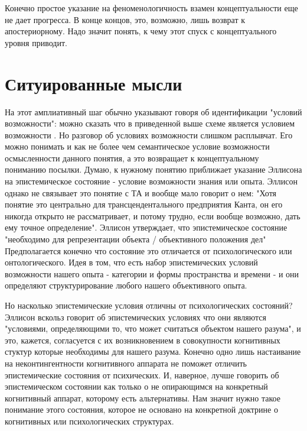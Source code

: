 \documentclass{article}
\begin{document}
Конечно простое указание на феноменологичность взамен концептуальности еще не дает прогресса. В конце концов, это, возможно, лишь возврат к апостериорному. Надо значит понять, к чему этот спуск с концептуального уровня приводит.

\section{Ситуированные мысли}

На этот амплиативный шаг обычно указывают говоря об идентификации "условий возможности": можно сказать что в приведенной выше схеме  является условием возможности . Но разговор об условиях возможности слишком расплывчат. Его можно понимать и как не более чем семантическое условие возможности осмысленности данного понятия, а это возвращает к концептуальному пониманию посылки. Думаю, к нужному понятию приближает указание Эллисона на эпистемическое состояние - условие возможности знания или опыта. Эллисон однако не связывает это понятие с ТА и вообще мало говорит о нем: "Хотя понятие это центрально для трансцендентального предприятия Канта, он его никогда открыто не рассматривает, и потому трудно, если вообще возможно, дать ему точное определение". Эллисон утверждает, что эпистемическое состояние "необходимо для репрезентации объекта / объективного положения дел" Предполагается конечно что состояние это отличается от психологического или онтологического. Идея в том, что есть набор эпистемических условий возможности нашего опыта - категории и формы пространства и времени - и они определяют структурирование любого нашего объективного опыта.

Но насколько эпистемические условия отличны от психологических состояний? Эллисон вскольз говорит об эпистемических условиях что они являются "условиями, определяющими то, что может считаться объектом нашего разума", и это, кажется, согласуется с их возникновением в совокупности когнитивных стуктур которые необходимы для нашего разума. Конечно одно лишь настаивание на неконтингентности когнитивного аппарата не поможет отличить эпистемические состояния от психических. И, наверное, лучше говорить об эпистемическом состоянии как только о не опирающимся на конкретный когнитивный аппарат, которому есть альтернативы. Нам значит нужно такое понимание этого состояния, которое не основано на конкретной доктрине о когнитивных или психологических структурах.
\end{document}
